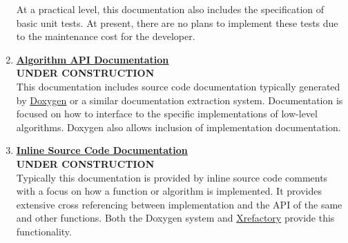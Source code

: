 \documentclass[12pt]{article}
\begin{document}
\begin{enumerate}
  At a practical level, this documentation also includes the
  specification of basic unit tests.  At present, there are no plans to implement these tests due to the
  maintenance cost for the developer.

\item \href{../contents-level6/contents-level6.pdf}{\bf \underline{Algorithm API Documentation}}\\
{\bf UNDER CONSTRUCTION}\\
  This documentation includes source code
  documentation typically generated by \href{http://www.stack.nl/~dimitri/doxygen/}{Doxygen} or a similar
  documentation extraction system.  Documentation is focused on how to interface
  to the specific implementations of low-level algorithms. Doxygen
  also allows inclusion of implementation documentation.

\item \href{../contents-level7/contents-level7.pdf}{\bf \underline{Inline Source Code Documentation}}\\
{\bf UNDER CONSTRUCTION}\\
  Typically this documentation is provided by inline source code comments with a focus on how a function
  or algorithm is implemented.  It provides extensive cross referencing between
  implementation and the API of the same and other functions.
  Both the Doxygen system and \href {http://www.xref.sk/xrefactory/main.html}{Xrefactory} provide this
  functionality.
  








\end{enumerate}
\end{document}
